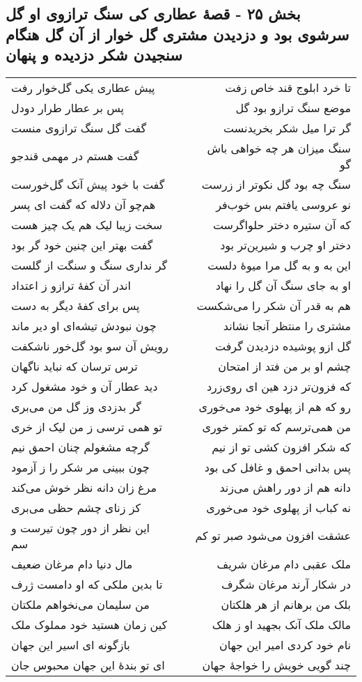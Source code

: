 \begin{center}
\section*{بخش ۲۵ - قصهٔ عطاری کی سنگ ترازوی او گل  سرشوی بود و دزدیدن  مشتری گل خوار از آن گل هنگام سنجیدن شکر دزدیده و پنهان}
\label{sec:sh025}
\begin{longtable}{l p{0.5cm} r}
پیش عطاری یکی گل‌خوار رفت
&&
تا خرد ابلوج قند خاص زفت
\\
پس بر عطار طرار دودل
&&
موضع سنگ ترازو بود گل
\\
گفت گل سنگ ترازوی منست
&&
گر ترا میل شکر بخریدنست
\\
گفت هستم در مهمی قندجو
&&
سنگ میزان هر چه خواهی باش گو
\\
گفت با خود پیش آنک گل‌خورست
&&
سنگ چه بود گل نکوتر از زرست
\\
هم‌چو آن دلاله که گفت ای پسر
&&
نو عروسی یافتم بس خوب‌فر
\\
سخت زیبا لیک هم یک چیز هست
&&
که آن ستیره دختر حلواگرست
\\
گفت بهتر این چنین خود گر بود
&&
دختر او چرب و شیرین‌تر بود
\\
گر نداری سنگ و سنگت از گلست
&&
این به و به گل مرا میوهٔ دلست
\\
اندر آن کفهٔ ترازو ز اعتداد
&&
او به جای سنگ آن گل را نهاد
\\
پس برای کفهٔ دیگر به دست
&&
هم به قدر آن شکر را می‌شکست
\\
چون نبودش تیشه‌ای او دیر ماند
&&
مشتری را منتظر آنجا نشاند
\\
رویش آن سو بود گل‌خور ناشکفت
&&
گل ازو پوشیده دزدیدن گرفت
\\
ترس ترسان که نباید ناگهان
&&
چشم او بر من فتد از امتحان
\\
دید عطار آن و خود مشغول کرد
&&
که فزون‌تر دزد هین ای روی‌زرد
\\
گر بدزدی وز گل من می‌بری
&&
رو که هم از پهلوی خود می‌خوری
\\
تو همی ترسی ز من لیک از خری
&&
من همی‌ترسم که تو کمتر خوری
\\
گرچه مشغولم چنان احمق نیم
&&
که شکر افزون کشی تو از نیم
\\
چون ببینی مر شکر را ز آزمود
&&
پس بدانی احمق و غافل کی بود
\\
مرغ زان دانه نظر خوش می‌کند
&&
دانه هم از دور راهش می‌زند
\\
کز زنای چشم حظی می‌بری
&&
نه کباب از پهلوی خود می‌خوری
\\
این نظر از دور چون تیرست و سم
&&
عشقت افزون می‌شود صبر تو کم
\\
مال دنیا دام مرغان ضعیف
&&
ملک عقبی دام مرغان شریف
\\
تا بدین ملکی که او دامست ژرف
&&
در شکار آرند مرغان شگرف
\\
من سلیمان می‌نخواهم ملکتان
&&
بلک من برهانم از هر هلکتان
\\
کین زمان هستید خود مملوک ملک
&&
مالک ملک آنک بجهید او ز هلک
\\
بازگونه ای اسیر این جهان
&&
نام خود کردی امیر این جهان
\\
ای تو بندهٔ این جهان محبوس جان
&&
چند گویی خویش را خواجهٔ جهان
\\
\end{longtable}
\end{center}
